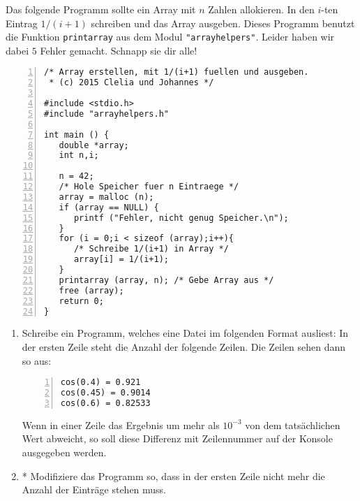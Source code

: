 \documentclass{uebungszettel}
\begin{document}
\begin{aufg}
Das folgende Programm sollte ein Array mit $n$ Zahlen 
allokieren. In den $i$-ten Eintrag $1/(i+1)$ schreiben und das Array ausgeben.
Dieses Programm benutzt die Funktion \verb|printarray| aus dem Modul \verb|"arrayhelpers"|.
Leider haben wir dabei $5$ Fehler gemacht. 
Schnapp sie dir alle! 

\begin{codelisting}
\begin{lstlisting}[numbers=left,numberstyle=\tiny,frame=tlrb,showstringspaces=false]
/* Array erstellen, mit 1/(i+1) fuellen und ausgeben. 
 * (c) 2015 Clelia und Johannes */

#include <stdio.h>
#include "arrayhelpers.h"

int main () {
   double *array;
   int n,i;   
	
   n = 42;
   /* Hole Speicher fuer n Eintraege */
   array = malloc (n);  
   if (array == NULL) {
      printf ("Fehler, nicht genug Speicher.\n");
   }
   for (i = 0;i < sizeof (array);i++){
      /* Schreibe 1/(i+1) in Array */
      array[i] = 1/(i+1);   
   }
   printarray (array, n); /* Gebe Array aus */
   free (array);	
   return 0;
}
\end{lstlisting}
\end{codelisting}
\end{aufg} 

\begin{aufg}
\begin{enumerate}
\item
Schreibe ein Programm, welches eine Datei im folgenden Format ausliest:
In der ersten Zeile steht die Anzahl der folgende Zeilen.
Die Zeilen sehen dann so aus:
\medskip \begin{codelisting}
\begin{lstlisting}[numbers=left,numberstyle=\tiny,frame=tlrb,mathescape=true]
cos(0.4) = 0.921
cos(0.45) = 0.9014
cos(0.6) = 0.82533
\end{lstlisting}
\end{codelisting}
Wenn in einer Zeile das Ergebnis um mehr als $10^{-3}$ von dem tats\"achlichen Wert abweicht, 
so soll diese Differenz mit Zeilennummer auf der Konsole ausgegeben werden.
\item * Modifiziere das Programm so, dass in der ersten Zeile nicht mehr die Anzahl der Eintr\"age
	stehen muss.
\end{enumerate}
\end{aufg}
\end{document}
